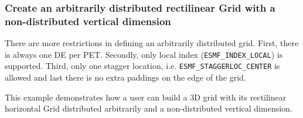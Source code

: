 
  \subsubsection{Create an arbitrarily distributed rectilinear Grid with
                  a non-distributed vertical dimension}
   \label{example:ArbGridWithUndistDim}
  
   \begin{sloppypar}
   There are more restrictions in defining an arbitrarily distributed grid.
   First, there is always one DE per PET.  Secondly, only local index ({\tt ESMF\_INDEX\_LOCAL})
   is supported. Third, only one stagger location, i.e. {\tt ESMF\_STAGGERLOC\_CENTER} is allowed
   and last there is no extra paddings on the edge of the grid.
   \end{sloppypar}
  
   This example demonstrates how a user can build a 3D grid with its rectilinear
   horizontal Grid distributed arbitrarily and a non-distributed vertical dimension.
   


